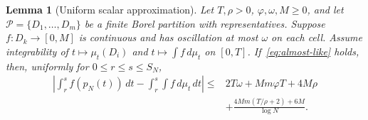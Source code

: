 \documentclass[11pt]{article}
\numberwithin{equation}{section}
\newtheorem{lemma}[theorem]{Lemma}
\theoremstyle{definition}
\theoremstyle{remark}
\newcommand{\1}{\mathbf 1}
\begin{document}
\begin{lemma}[Uniform scalar approximation]%
\label{lem:scalar-quadrature}
Let $T,\rho>0$, $\varphi,\omega,M\ge0$, and let
$\mathcal P=\{D_1,\ldots,D_m\}$ be a finite Borel partition with
representatives. Suppose $f:D_k\to[0,M]$ is continuous and has
oscillation at most $\omega$ on each cell. Assume integrability of
$t\mapsto\mu_t(D_i)$ and $t\mapsto\int f\,d\mu_t$ on $[0,T]$.
If~\eqref{eq:almost-like} holds, then, uniformly for
$0\le r\le s\le S_N$,
\begin{align}\label{eq:quadrature-bound}
 \left|\int_r^s f(p_N(t))\,dt-
              \int_r^s\int f\,d\mu_t\,dt\right|
 \le{}&2T\omega+Mm\varphi T+4M\rho\nonumber\\
 &+\frac{4Mm(T/\rho+2)+6M}{\log N}.
\end{align}
\end{lemma}
\end{document}

